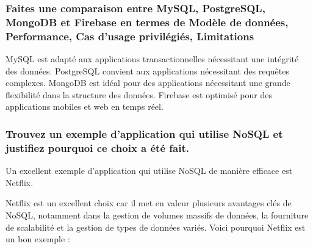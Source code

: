 \documentclass{article}
\begin{document}
\subsubsection{Faites une comparaison entre MySQL, PostgreSQL, MongoDB et Firebase en termes de Modèle de données, Performance, Cas d’usage privilégiés, Limitations}
MySQL est adapté aux applications transactionnelles nécessitant une intégrité des données. 
PostgreSQL convient aux applications nécessitant des requêtes complexes.  
MongoDB est idéal pour des applications nécessitant une grande flexibilité dans la structure des 
données. 
Firebase est optimisé pour des applications mobiles et web en temps réel. 


\subsubsection{Trouvez un exemple d’application qui utilise NoSQL et justifiez pourquoi ce choix a été fait.}
Un excellent exemple d'application qui utilise NoSQL de manière efficace est Netflix.

Netflix est un excellent choix car il met en valeur plusieurs avantages clés de NoSQL, notamment dans la gestion de volumes massifs de données, la fourniture de scalabilité et la gestion de types de données variés. Voici pourquoi Netflix est un bon exemple :
\end{document}
